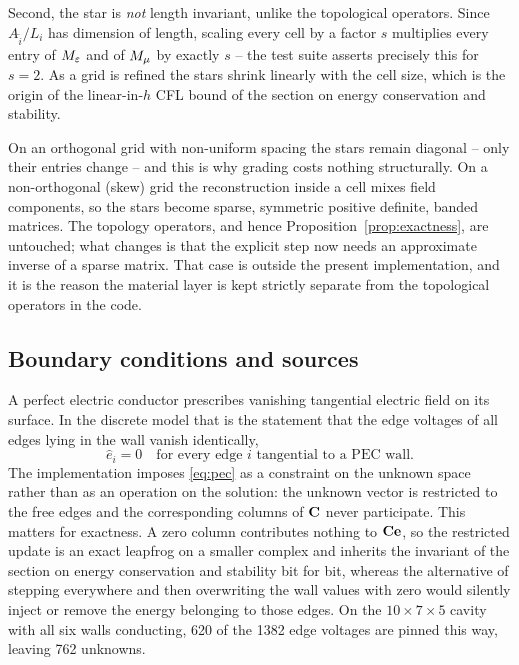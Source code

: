 Second, the star is \emph{not} length invariant, unlike the topological operators. Since $A_{\tilde i}/L_i$ has
dimension of length, scaling every cell by a factor $s$ multiplies every entry of ${M_{\varepsilon}}$ and of ${M_{\mu}}$ by exactly
$s$ -- the test suite asserts precisely this for $s=2$. As a grid is refined the stars shrink linearly with the
cell size, which is the origin of the linear-in-$h$ CFL bound of the section on energy conservation and stability.

\begin{remark}
On an orthogonal grid with non-uniform spacing the stars remain diagonal -- only their entries change -- and this
is why grading costs nothing structurally. On a non-orthogonal (skew) grid the reconstruction inside a cell mixes
field components, so the stars become sparse, symmetric positive definite, banded matrices. The topology
operators, and hence Proposition~\ref{prop:exactness}, are untouched; what changes is that the explicit step now needs an
approximate inverse of a sparse matrix. That case is outside the present implementation, and it is the reason the
material layer is kept strictly separate from the topological operators in the code.
\end{remark}

\subsection{Boundary conditions and sources}

A perfect electric conductor prescribes vanishing tangential electric field on its surface. In the discrete model
that is the statement that the edge voltages of all edges lying in the wall vanish identically,
\begin{equation}
  \hat e_i = 0 \quad\text{for every edge } i \text{ tangential to a PEC wall}.
  \label{eq:pec}
\end{equation}
The implementation imposes \eqref{eq:pec} as a constraint on the unknown space rather than as an operation on the
solution: the unknown vector is restricted to the free edges and the corresponding columns of $\mathbf{C}$ never
participate. This matters for exactness. A zero column contributes nothing to $\mathbf{C}\mathbf{e}$, so the restricted
update is an exact leapfrog on a smaller complex and inherits the invariant of the section on energy conservation and stability bit for bit,
whereas the alternative of stepping everywhere and then overwriting the wall values with zero would silently
inject or remove the energy belonging to those edges. On the $10\times7\times5$ cavity with all six walls
conducting, 620 of the 1382 edge voltages are pinned this way, leaving 762 unknowns.


